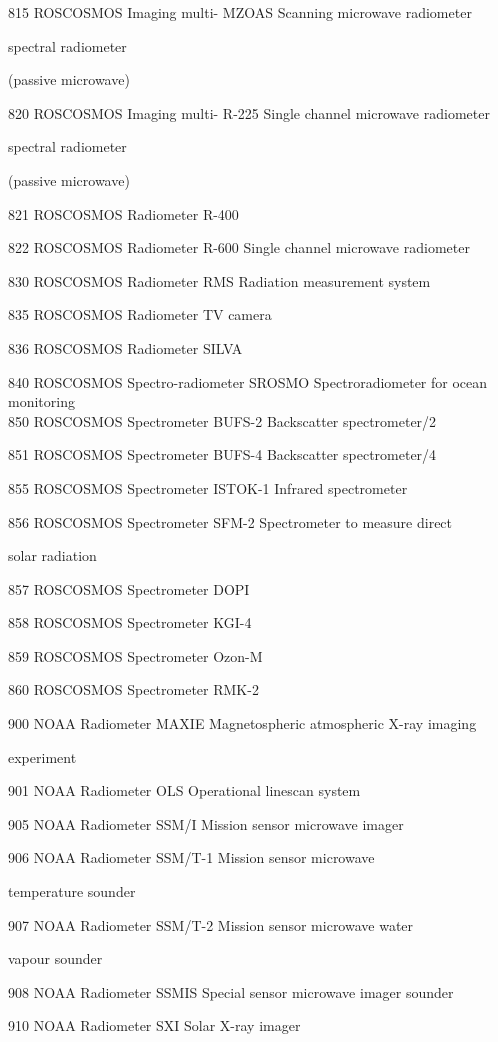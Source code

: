 815 ROSCOSMOS Imaging multi- MZOAS Scanning microwave radiometer

spectral radiometer

(passive microwave)

820 ROSCOSMOS Imaging multi- R-225 Single channel microwave radiometer

spectral radiometer

(passive microwave)

821 ROSCOSMOS Radiometer R-400

822 ROSCOSMOS Radiometer R-600 Single channel microwave radiometer

830 ROSCOSMOS Radiometer RMS Radiation measurement system

835 ROSCOSMOS Radiometer TV camera

836 ROSCOSMOS Radiometer SILVA

840 ROSCOSMOS Spectro-radiometer SROSMO Spectroradiometer for ocean monitoring\\
850 ROSCOSMOS Spectrometer BUFS-2 Backscatter spectrometer/2

851 ROSCOSMOS Spectrometer BUFS-4 Backscatter spectrometer/4

855 ROSCOSMOS Spectrometer ISTOK-1 Infrared spectrometer

856 ROSCOSMOS Spectrometer SFM-2 Spectrometer to measure direct

solar radiation

857 ROSCOSMOS Spectrometer DOPI

858 ROSCOSMOS Spectrometer KGI-4

859 ROSCOSMOS Spectrometer Ozon-M

860 ROSCOSMOS Spectrometer RMK-2

900 NOAA Radiometer MAXIE Magnetospheric atmospheric X-ray imaging

experiment

901 NOAA Radiometer OLS Operational linescan system

905 NOAA Radiometer SSM/I Mission sensor microwave imager

906 NOAA Radiometer SSM/T-1 Mission sensor microwave

temperature sounder

907 NOAA Radiometer SSM/T-2 Mission sensor microwave water

vapour sounder

908 NOAA Radiometer SSMIS Special sensor microwave imager sounder

910 NOAA Radiometer SXI Solar X-ray imager

